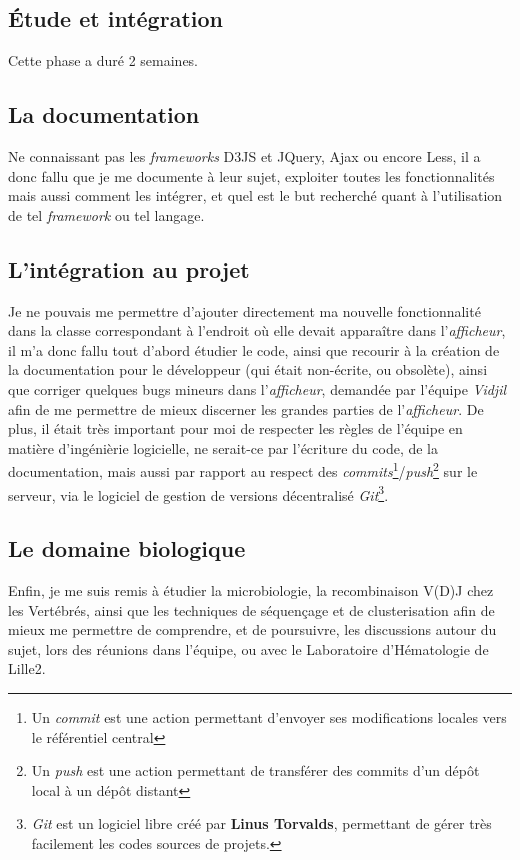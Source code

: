 \documentclass[12pt]{report}
\begin{document}
\begin{spacing}{1.2}
\section{Étude et intégration}

Cette phase a duré 2 semaines.

\subsection{La documentation}
Ne connaissant pas les \textit{frameworks} D3JS et JQuery, Ajax ou encore Less, il a donc fallu que je me documente à leur sujet, exploiter toutes les fonctionnalités mais aussi comment les intégrer, et quel est le but recherché quant à l'utilisation de tel \textit{framework} ou tel langage.

\subsection{L'intégration au projet}
Je ne pouvais me permettre d'ajouter directement ma nouvelle fonctionnalité dans la classe correspondant à l'endroit où elle devait apparaître dans l'\textit{afficheur}, il m'a donc fallu tout d'abord étudier le code, ainsi que recourir à la création de la documentation pour le développeur (qui était non-écrite, ou obsolète), ainsi que corriger quelques bugs mineurs dans l'\textit{afficheur}, demandée par l'équipe \textit{Vidjil} afin de me permettre de mieux discerner les grandes parties de l'\textit{afficheur}.
\newline
De plus, il était très important pour moi de respecter les règles de l'équipe en matière d'ingénièrie logicielle, ne serait-ce par l'écriture du code, de la documentation, mais aussi par rapport au respect des \textit{commits}\footnote{Un \textit{commit} est une action permettant d'envoyer ses modifications locales vers le référentiel central}/\textit{push}\footnote{Un \textit{push} est une action permettant de transférer des commits d'un dépôt local à un dépôt distant} sur le serveur, via le logiciel de gestion de versions décentralisé \textit{Git}\footnote{\textit{Git} est un logiciel libre créé par \textbf{Linus Torvalds}, permettant de gérer très facilement les codes sources de projets.}.

\subsection{Le domaine biologique}
Enfin, je me suis remis à étudier la microbiologie, la recombinaison V(D)J chez les Vertébrés, ainsi que les techniques de séquençage et de clusterisation afin de mieux me permettre de comprendre, et de poursuivre, les discussions autour du sujet, lors des réunions dans l'équipe, ou avec le Laboratoire d'Hématologie de Lille2.


\end{spacing}
\end{document}
